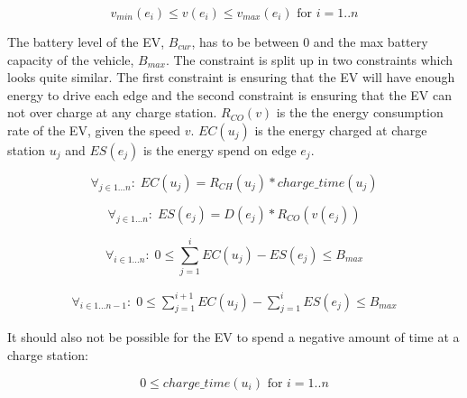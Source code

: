 \begin{equation}
v_{min}(e_i) \leq v(e_i) \leq v_{max}(e_i) \text{ for } i = 1..n  
\end{equation}

The battery level of the EV, $B_{cur}$, has to be between $0$ and the max battery capacity of the vehicle, $B_{max}$. The constraint is split up in two constraints which looks quite similar. The first constraint is ensuring that the EV will have enough energy to drive each edge and the second constraint is ensuring that the EV can not over charge at any charge station. $R_{CO}(v)$ is the the energy consumption rate of the EV, given the speed $v$. $EC(u_j)$ is the energy charged at charge station $u_j$ and $ES(e_j)$ is the
energy spend on edge $e_j$.  

\begin{equation}
\forall_{j\in1 \dots n }:\; EC(u_j) = R_{CH}(u_j) * charge\_time(u_j)
\end{equation}

\begin{equation}
\forall_{j\in1 \dots n }:\; ES(e_j) = D(e_j)*R_{CO}(v(e_j))
\end{equation} 

\begin{equation}
\forall_{i\in1 \dots n }:\;0 \leq \sum_{j=1}^{i} EC(u_j) - ES(e_j) \leq B_{max} 
\end{equation}

\begin{equation}
\begin{aligned}
\forall_{i\in1 \dots n-1}:\;0 \leq \sum_{j=1}^{i+1} EC(u_j) - \sum_{j=1}^{i} ES(e_j) \leq B_{max} 
\end{aligned}
\end{equation}

It should also not be possible for the EV to spend a negative amount of time at a charge station:

\begin{equation}
0 \leq charge\_time(u_i) \text{ for } i = 1..n 
\end{equation}



